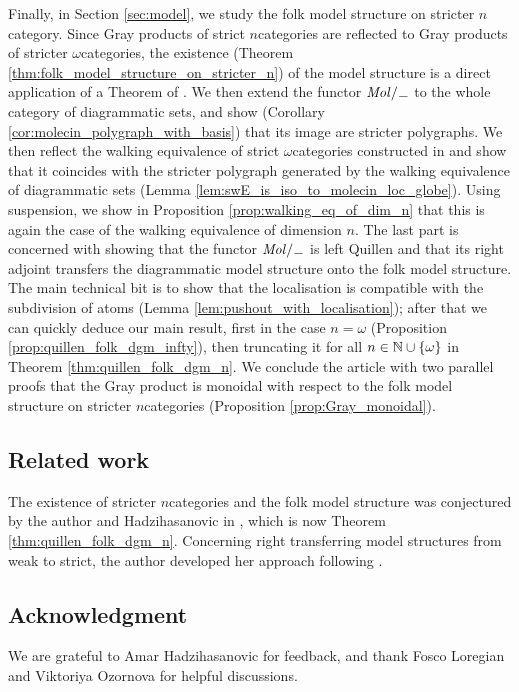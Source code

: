 Finally, in Section \ref{sec:model}, we study the folk model structure on stricter \( n \)\nbd category. 
Since Gray products of strict \( n \)\nbd categories are reflected to Gray products of stricter \( \omega \)\nbd categories, the existence (Theorem \ref{thm:folk_model_structure_on_stricter_n}) of the model structure is a direct application of a Theorem of \cite{ara2025polygraphs}.
We then extend the functor \( \molecin{-} \) to the whole category of diagrammatic sets, and show (Corollary \ref{cor:molecin_polygraph_with_basis}) that its image are stricter polygraphs. 
We then reflect the walking equivalence of strict \( \omega \)\nbd categories constructed in \cite{hadzihasanovic2024model} and show that it coincides with the stricter polygraph generated by the walking equivalence of diagrammatic sets (Lemma \ref{lem:swE_is_iso_to_molecin_loc_globe}).
Using suspension, we show in Proposition \ref{prop:walking_eq_of_dim_n} that this is again the case of the walking equivalence of dimension \( n \).
The last part is concerned with showing that the functor \( \molecin{-} \) is left Quillen and that its right adjoint transfers the diagrammatic model structure onto the folk model structure.
The main technical bit is to show that the localisation is compatible with the subdivision of atoms (Lemma \ref{lem:pushout_with_localisation}); after that we can quickly deduce our main result, first in the case \( n = \omega \) (Proposition \ref{prop:quillen_folk_dgm_infty}), then truncating it for all \( n \in \mathbb{N} \cup \left\{ {\omega} \right\} \) in Theorem \ref{thm:quillen_folk_dgm_n}.  
We conclude the article with two parallel proofs that the Gray product is monoidal with respect to the folk model structure on stricter \( n \)\nbd categories (Proposition \ref{prop:Gray_monoidal}).

\subsection*{Related work}

The existence of stricter \( n \)\nbd categories and the folk model structure was conjectured by the author and Hadzihasanovic in \cite[Conjecture 6.3]{chanavat2024model}, which is now Theorem \ref{thm:quillen_folk_dgm_n}.
Concerning right transferring model structures from weak to strict, the author developed her approach following \cite{ozornova2021nerves}.

\subsection*{Acknowledgment}
\noindent We are grateful to Amar Hadzihasanovic for feedback, and thank Fosco Loregian and Viktoriya Ozornova for helpful discussions.


